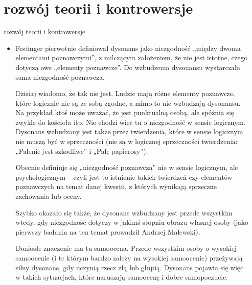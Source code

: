\documentclass{beamer}
\begin{document}
\section{rozwój teorii i kontrowersje}
\begin{frame}{rozwój teorii i kontrowersje}
\begin{itemize}
\item
Festinger pierwotnie definiował dysonans jako niezgodność „między dwoma elementami poznawczymi”, z milczącym założeniem, że nie jest istotne, czego dotyczą owe „elementy poznawcze”. Do wzbudzenia dysonansu wystarczała sama niezgodność poznawcza.

Dzisiaj wiadomo, że tak nie jest. Ludzie mają różne elementy poznawcze, które logicznie nie są ze sobą zgodne, a mimo to nie wzbudzają dysonansu. Na przykład ktoś może uważać, że jest punktualną osobą, ale spóźnia się zwykle do kościoła itp. Nie chodzi więc tu o niezgodność w sensie logicznym. Dysonans wzbudzany jest także przez twierdzenia, które w sensie logicznym nie muszą być w sprzeczności (nie są w logicznej sprzeczności twierdzenia: „Palenie jest szkodliwe” i „Palę papierosy”).

Obecnie definiuje się „niezgodność poznawczą” nie w sensie logicznym, ale psychologicznym – czyli jest to istnienie takich twierdzeń czy elementów poznawczych na temat danej kwestii, z których wynikają sprzeczne zachowania lub oceny.

Szybko okazało się także, że dysonans wzbudzany jest przede wszystkim wtedy, gdy niezgodność dotyczy w jakimś stopniu obrazu własnej osoby (jako pierwszy badania na ten temat prowadził Andrzej Malewski).

Doniosłe znaczenie ma tu samoocena. Przede wszystkim osoby o wysokiej samoocenie (i te którym bardzo zależy na wysokiej samoocenie) przeżywają silny dysonans, gdy uczynią rzecz złą lub głupią. Dysonans pojawia się więc w takich sytuacjach, które naruszają samoocenę i dobre samopoczucie.
\end{itemize}
\end{frame}
\end{document}
